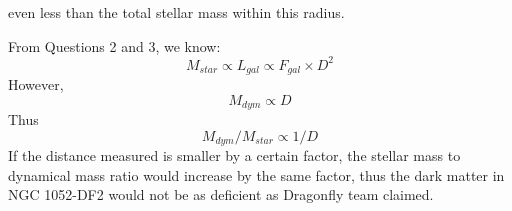 \begin{description}
\begin{equation*}
  \tag*{(3 points)}
  \end{equation*}
  even less than the total stellar mass within this radius.
\item[(4)] From Questions 2 and 3, we know:
  \[
  M_{star} \propto L_{gal} \propto F_{gal} \times D^2
  \]
  However,
  \begin{equation*}
  M_{dym} \propto D %
  \tag*{(2 points)}
  \end{equation*}
  Thus
  \begin{equation*}
  M_{dym}/M_{star} \propto 1/D
  \tag*{(2 points)}
  \end{equation*}
  If the distance measured is smaller by a certain factor, the stellar mass to
  dynamical mass ratio would increase by the same factor, thus the dark matter
  in NGC 1052-DF2 would not be as deficient as Dragonfly team claimed.
\end{description}
